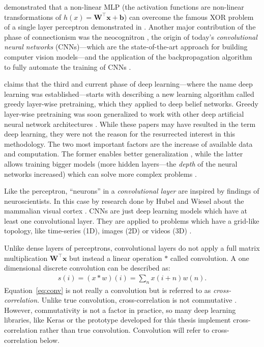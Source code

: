 \documentclass[]{article}
\begin{document}
\citet{hornik_et_al_1989} demonstrated that a non-linear MLP
(the activation functions are non-linear transformations of
$h(x) = \mathbf{W}^\top\mathbf{x} + \mathbf{b}$) can overcome the
famous XOR problem of a single layer perceptron demonstrated in
\citet{minsky_et_al_1969}.
Another major contribution of the phase of connectionism was the
neocognitron \citep{fukushima_1980}, the origin of today's
\textit{convolutional neural networks} (CNNs)---which are the
state-of-the-art approach for building computer vision models---and
the application of the backpropagation algorithm to fully automate the
training of CNNs \citep{lecun_et_al_1989}.

\citet{goodfellow_et_al_2016} claims that the third and current phase
of deep learning---where the name deep learning was
established---starts with \citet{hinton_et_al_2006} describing a new
learning algorithm called greedy layer-wise pretraining, which they
applied to deep belief networks.
Greedy layer-wise pretraining was soon generalized to work with other
deep artificial neural network architectures
\citep{renzato_et_al_2006, bengio_et_al_2007}.
While these papers may have resulted in the term deep learning,
they were not the reason for the resurrected interest in this
methodology.
The two most important factors are the increase of available data
and computation.
The former enables better generalization
\citep{goodfellow_et_al_2016}, while the latter allows
training bigger models (more hidden layers---the \textit{depth} of the
neural networks increased) which can solve more complex problems
\citep{bengio_et_al_2007a, goodfellow_et_al_2016}.

Like the perceptron, ``neurons'' in a \textit{convolutional layer}
are inspired by findings of neuroscientists.
In this case by research done by Hubel and Wiesel about the
mammalian visual cortex
\citep{hubel_et_al_1959, hubel_et_al_1962, hubel_et_al_1968}.
CNNs are just deep learning models which have at least one
convolutional layer. They are applied to problems which have a
grid-like topology, like time-series (1D), images (2D) or videos (3D)
\citep{goodfellow_et_al_2016}.

Unlike dense layers of perceptrons, convolutional layers do not apply
a full matrix multiplication $\mathbf{W}^\top\mathbf{x}$ but instead
a linear operation $*$ called convolution.
A one dimensional discrete convolution can be described as:
\begin{align}
  \label{eq:conv}
  s(i) = (x * w)(i) = \sum_n x(i + n)w(n).
\end{align}
Equation~\ref{eq:conv} is not really a convolution but is referred to
as \textit{cross-correlation}.
Unlike true convolution, cross-correlation is not commutative
\citep{goodfellow_et_al_2016}.
However, commutativity is not a factor in practice, so many deep
learning libraries, like Keras \citep{keras} or the prototype
developed for this thesis implement cross-correlation rather than true
convolution.
Convolution will refer to cross-correlation below.
\end{document}
